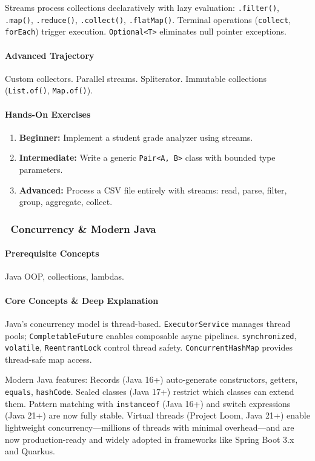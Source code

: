 \documentclass[11pt, a4paper, oneside]{report}
\newcommand{\mustmaster}[1]{\subsubsection{\texorpdfstring{\fcolorbox{blue!40!black}{blue!8}{\footnotesize\bfseries\color{blue!40!black} MUST MASTER}~#1}{#1}}}
\begin{document}
Streams process collections declaratively with lazy evaluation: \texttt{.filter()}, \texttt{.map()}, \texttt{.reduce()}, \texttt{.collect()}, \texttt{.flatMap()}. Terminal operations (\texttt{collect}, \texttt{forEach}) trigger execution. \texttt{Optional<T>} eliminates null pointer exceptions.

\paragraph{Advanced Trajectory} Custom collectors. Parallel streams. Spliterator. Immutable collections (\texttt{List.of()}, \texttt{Map.of()}).

\paragraph{Hands-On Exercises}
\begin{enumerate}[leftmargin=*]
\item \textbf{Beginner:} Implement a student grade analyzer using streams.
\item \textbf{Intermediate:} Write a generic \texttt{Pair<A, B>} class with bounded type parameters.
\item \textbf{Advanced:} Process a CSV file entirely with streams: read, parse, filter, group, aggregate, collect.
\end{enumerate}

\mustmaster{Concurrency \& Modern Java}

\paragraph{Prerequisite Concepts} Java OOP, collections, lambdas.

\paragraph{Core Concepts \& Deep Explanation} Java's concurrency model is thread-based. \texttt{ExecutorService} manages thread pools; \texttt{CompletableFuture} enables composable async pipelines. \texttt{synchronized}, \texttt{volatile}, \texttt{ReentrantLock} control thread safety. \texttt{ConcurrentHashMap} provides thread-safe map access.

Modern Java features: Records (Java 16+) auto-generate constructors, getters, \texttt{equals}, \texttt{hashCode}. Sealed classes (Java 17+) restrict which classes can extend them. Pattern matching with \texttt{instanceof} (Java 16+) and switch expressions (Java 21+) are now fully stable. Virtual threads (Project Loom, Java 21+) enable lightweight concurrency---millions of threads with minimal overhead---and are now production-ready and widely adopted in frameworks like Spring Boot 3.x and Quarkus.
\end{document}
